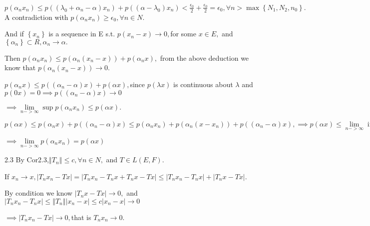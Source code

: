 \documentclass{article}
\begin{document}
$p\left( \alpha _{n}x_{n}\right) \leq p\left( \left( \lambda _{0}+\alpha
_{n}-\alpha \right) x_{n}\right) +p\left( \left( \alpha -\lambda _{0}\right)
x_{n}\right) <\frac{\epsilon _{0}}{2}+\frac{\epsilon _{0}}{2}=\epsilon
_{0},\forall n>\max \left\{ N_{1},N_{2},n_{0}\right\} .$A contradiction with 
$p\left( \alpha _{n}x_{n}\right) \geq \epsilon _{0},\forall n\in N.$

\bigskip And if $\left\{ x_{n}\right\} $ is a sequence in E s.t. $p\left(
x_{n}-x\right) \rightarrow 0,$for some $x\in E,$ and $\left\{ \alpha
_{n}\right\} \subset R,\alpha _{n}\rightarrow \alpha .$

Then $p\left( \alpha _{n}x_{n}\right) \leq p\left( \alpha _{n}\left(
x_{n}-x\right) \right) +p\left( \alpha _{n}x\right) ,$ from the above
deduction we know that  $p\left( \alpha _{n}\left( x_{n}-x\right) \right)
\rightarrow 0.$

$p\left( \alpha _{n}x\right) \leq p\left( \left( \alpha _{n}-\alpha \right)
x\right) +p\left( \alpha x\right) ,$since $p\left( \lambda x\right) $ is
continuous about $\lambda $ and $p\left( 0x\right) =0\implies p\left( \left(
\alpha _{n}-\alpha \right) x\right) \rightarrow 0$

$\implies \underset{n->\infty }{\lim }\sup p\left( \alpha _{n}x_{n}\right)
\leq p\left( \alpha x\right) .$

$p\left( \alpha x\right) \leq p\left( \alpha _{n}x\right) +p\left( \left(
\alpha _{n}-\alpha \right) x\right) \leq p\left( \alpha _{n}x_{n}\right)
+p\left( \alpha _{n}\left( x-x_{n}\right) \right) +p\left( \left( \alpha
_{n}-\alpha \right) x\right) ,\implies p\left( \alpha x\right) \leq \underset%
{n->\infty }{\lim }\inf p\left( \alpha _{n}x\right) $

$\implies \underset{n->\infty }{\lim }p\left( \alpha _{n}x_{n}\right)
=p\left( \alpha x\right) $

2.3 By Cor2.3,$\left\Vert T_{n}\right\Vert \leq c,\forall n\in N,$ and $T\in
L\left( E,F\right) .$

If $x_{n}\rightarrow x,\left\vert T_{n}x_{n}-Tx\right\vert =\left\vert
T_{n}x_{n}-T_{n}x+T_{n}x-Tx\right\vert \leq \left\vert
T_{n}x_{n}-T_{n}x\right\vert +\left\vert T_{n}x-Tx\right\vert .$

By condition we know $\left\vert T_{n}x-Tx\right\vert \rightarrow 0,$ and $%
\left\vert T_{n}x_{n}-T_{n}x\right\vert \leq \left\Vert T_{n}\right\Vert
\left\vert x_{n}-x\right\vert \leq c\left\vert x_{n}-x\right\vert
\rightarrow 0$

$\implies \left\vert T_{n}x_{n}-Tx\right\vert \rightarrow 0,$that is $%
T_{n}x_{n}\rightarrow 0.$
\end{document}

